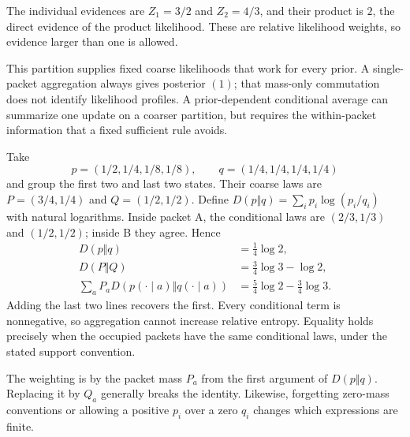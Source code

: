 The individual evidences are $Z_1=3/2$ and $Z_2=4/3$, and their product is $2$, the direct evidence of the product likelihood. These are relative likelihood weights, so evidence larger than one is allowed.

This partition supplies fixed coarse likelihoods that work for every prior. A single-packet aggregation always gives posterior $(1)$; that mass-only commutation does not identify likelihood profiles. A prior-dependent conditional average can summarize one update on a coarser partition, but requires the within-packet information that a fixed sufficient rule avoids.

Take
\[
p=(1/2,1/4,1/8,1/8),\qquad q=(1/4,1/4,1/4,1/4)
\]
and group the first two and last two states. Their coarse laws are $P=(3/4,1/4)$ and $Q=(1/2,1/2)$. Define $D(p\Vert q)=\sum_i p_i\log(p_i/q_i)$ with natural logarithms.
Inside packet A, the conditional laws are $(2/3,1/3)$ and $(1/2,1/2)$; inside B they agree. Hence
\[
\begin{aligned}
D(p\Vert q)&=\tfrac14\log2,\\
D(P\Vert Q)&=\tfrac34\log3-\log2,\\
\sum_aP_aD(p(\cdot\mid a)\Vert q(\cdot\mid a))
&=\tfrac54\log2-\tfrac34\log3.
\end{aligned}
\]
Adding the last two lines recovers the first. Every conditional term is nonnegative, so aggregation cannot increase relative entropy. Equality holds precisely when the occupied packets have the same conditional laws, under the stated support convention.

The weighting is by the packet mass $P_a$ from the first argument of $D(p\Vert q)$. Replacing it by $Q_a$ generally breaks the identity. Likewise, forgetting zero-mass conventions or allowing a positive $p_i$ over a zero $q_i$ changes which expressions are finite.

